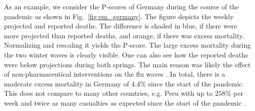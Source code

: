 \documentclass{article}
\newcommand{\figref}[1]{Fig.~\ref{#1}}
\begin{document}
As an example, we consider the P-scores of Germany during the course of the pandemic as shown in \figref{fig:em_germany}. The figure depicts the weekly projected and reported deaths. The difference is shaded in blue, if there were more projected than reported deaths, and orange, if there was excess mortality. Normalizing and rescaling it yields the P-score. The large excess mortality during the two winter waves is clearly visible. One can also see how the reported deaths were below projections during both springs. The main reason was likely the effect of non-pharmaceutical interventions on the flu waves \citep{olsen20}. In total, there is a moderate excess mortality in Germany of $4.4\%$ since the start of the pandemic. This does not compare to many other countries, e.g. Peru with up to $258\%$ per week and twice as many casualties as expected since the start of the pandemic \citep{owid_20}.

\end{document}
